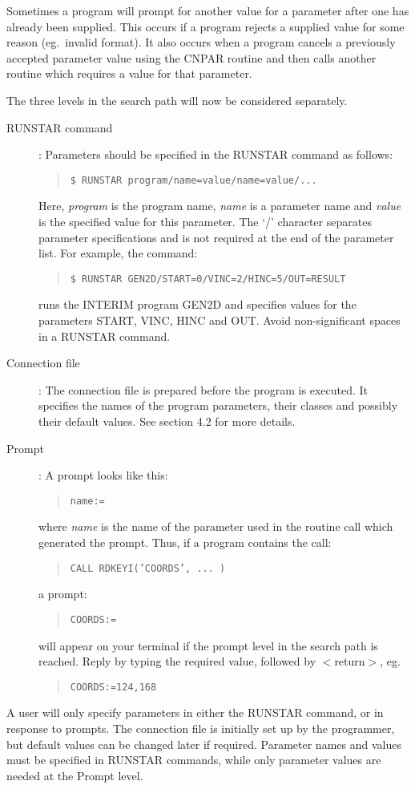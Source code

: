 Sometimes a program will prompt for another value for a parameter after one has
already been supplied.
This occurs if a program rejects a supplied value for some reason (eg.\ invalid
format).
It also occurs when a program cancels a previously accepted parameter value
using the CNPAR routine and then calls another routine which requires a value
for that parameter.

The three levels in the search path will now be considered separately.
\begin{description}
\item [RUNSTAR command]:
Parameters should be specified in the RUNSTAR command as follows:
\begin{quote}
{\tt \$ RUNSTAR program/name=value/name=value/...}
\end{quote}
Here, {\em program} is the program name, {\em name} is a parameter name and
{\em value} is the specified value for this parameter.
The `/' character separates parameter specifications and is not required at the
end of the parameter list.
For example, the command:
\begin{quote}
{\tt \$ RUNSTAR GEN2D/START=0/VINC=2/HINC=5/OUT=RESULT}
\end{quote}
runs the INTERIM program GEN2D and specifies values for the parameters
START, VINC, HINC and OUT.
Avoid non-significant spaces in a RUNSTAR command.
\item [Connection file]:
The connection file is prepared before the program is executed.
It specifies the names of the program parameters, their classes and possibly
their default values.
See section 4.2 for more details.
\item [Prompt]:
A prompt looks like this:
\begin{quote}
{\tt name:=}
\end{quote}
where {\em name} is the name of the parameter used in the routine call which
generated the prompt.
Thus, if a program contains the call:
\begin{quote}
{\tt CALL RDKEYI('COORDS', ... )}
\end{quote}
a prompt:
\begin{quote}
{\tt COORDS:=}
\end{quote}
will appear on your terminal if the prompt level in the search path is reached.
Reply by typing the required value, followed by $<$return$>$, eg.
\begin{quote}
{\tt COORDS:=124,168}
\end{quote}
\end{description}
A user will only specify parameters in either the RUNSTAR command, or in
response to prompts.
The connection file is initially set up by the programmer, but default values
can be changed later if required.
Parameter names and values must be specified in RUNSTAR commands, while only
parameter values are needed at the Prompt level.

